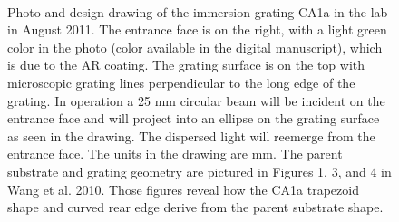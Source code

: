 \begin{figure}
  \centering
	~
  \caption{Photo and design drawing of the immersion grating CA1a in the lab in August 2011.  The entrance face is on the right, with a light green color in the photo (color available in the digital manuscript), which is due to the AR coating.  The grating surface is on the top with microscopic grating lines perpendicular to the long edge of the grating.  In operation a 25 mm circular beam will be incident on the entrance face and will project into an ellipse on the grating surface as seen in the drawing.  The dispersed light will reemerge from the entrance face.  The units in the drawing are mm.  The parent substrate and grating geometry are pictured in Figures 1, 3, and 4 in Wang et al. 2010\cite{wang2010}.  Those figures reveal how the CA1a trapezoid shape and curved rear edge derive from the parent substrate shape.}
  \label{fig:gram}
\end{figure}

